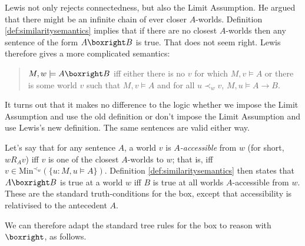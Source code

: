 Lewis not only rejects connectedness, but also the Limit Assumption. He argued
that there might be an infinite chain of ever closer $A$-worlds. Definition
\ref{def:similaritysemantics} implies that if there are no closest $A$-worlds
then any sentence of the form $A \boxright B$ is true. That does not seem right.
Lewis therefore gives a more complicated semantics:

\begin{quote}
  $M,w \models A \boxright B$ iff either there is no $v$ for
  which $M,v\models A$ or there is some world $v$ such that
  $M,v\models A$ and for all $u \prec_w v$, $M,u \models A \to B$.
\end{quote}
%
It turns out that it makes no difference to the logic whether we impose the
Limit Assumption and use the old definition or don't impose the Limit Assumption
and use Lewis's new definition. The same sentences are valid either
way. %


\iffalse

Let's say that for any sentence $A$, a world $v$ is \emph{$A$-accessible} from
$w$ (for short, $wR_Av$) iff $v$ is one of the closest $A$-worlds to $w$; that
is, iff $v \in \mathrm{Min}^{\prec_w}(\{u: M,u \models A\})$. Definition
\ref{def:similaritysemantics} then states that $A \boxright B$ is true at a
world $w$ iff $B$ is true at all worlds $A$-accessible from $w$. These are the
standard truth-conditions for the box, except that accessibility is relativised
to the antecedent $A$.

We can therefore adapt the standard tree rules for the box to reason with
$\boxright$, as follows.

\bigskip
\begin{center}
\begin{minipage}{0.4\textwidth} \centering
{}
\end{minipage}
\begin{minipage}{0.4\textwidth}\centering
{}
\end{minipage}
\end{center}
\bigskip

